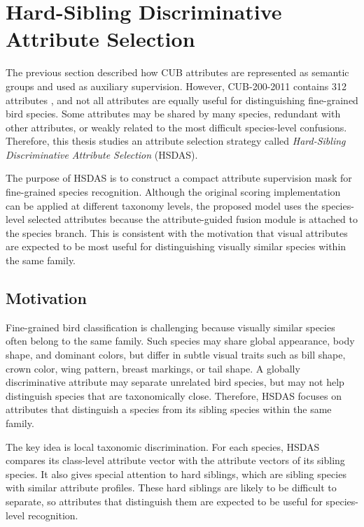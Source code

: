 \section{Hard-Sibling Discriminative Attribute Selection}

The previous section described how CUB attributes are represented as semantic groups and used as auxiliary supervision. However, CUB-200-2011 contains 312 attributes \cite{wah2011cub}, and not all attributes are equally useful for distinguishing fine-grained bird species. Some attributes may be shared by many species, redundant with other attributes, or weakly related to the most difficult species-level confusions. Therefore, this thesis studies an attribute selection strategy called \textit{Hard-Sibling Discriminative Attribute Selection} (HSDAS).

The purpose of HSDAS is to construct a compact attribute supervision mask for fine-grained species recognition. Although the original scoring implementation can be applied at different taxonomy levels, the proposed model uses the species-level selected attributes because the attribute-guided fusion module is attached to the species branch. This is consistent with the motivation that visual attributes are expected to be most useful for distinguishing visually similar species within the same family.

\subsection{Motivation}

Fine-grained bird classification is challenging because visually similar species often belong to the same family. Such species may share global appearance, body shape, and dominant colors, but differ in subtle visual traits such as bill shape, crown color, wing pattern, breast markings, or tail shape. A globally discriminative attribute may separate unrelated bird species, but may not help distinguish species that are taxonomically close. Therefore, HSDAS focuses on attributes that distinguish a species from its sibling species within the same family.

The key idea is local taxonomic discrimination. For each species, HSDAS compares its class-level attribute vector with the attribute vectors of its sibling species. It also gives special attention to hard siblings, which are sibling species with similar attribute profiles. These hard siblings are likely to be difficult to separate, so attributes that distinguish them are expected to be useful for species-level recognition.


